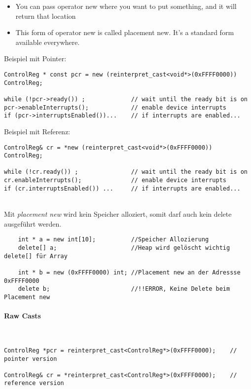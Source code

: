 \begin{itemize}
	\item You can pass operator new where you want to put something, and it will return that location
	\item This form of operator new is called placement new.
			It’s a standard form available everywhere.
\end{itemize}

Beispiel mit Pointer:
\begin{lstlisting}
ControlReg * const pcr = new (reinterpret_cast<void*>(0xFFFF0000)) ControlReg;

while (!pcr->ready()) ; 			// wait until the ready bit is on
pcr->enableInterrupts(); 			// enable device interrupts
if (pcr->interruptsEnabled())... 	// if interrupts are enabled...

\end{lstlisting}

Beispiel mit Referenz:
\begin{lstlisting}
ControlReg& cr = *new (reinterpret_cast<void*>(0xFFFF0000)) ControlReg;

while (!cr.ready()) ; 				// wait until the ready bit is on
cr.enableInterrupts(); 				// enable device interrupts
if (cr.interruptsEnabled()) ... 	// if interrupts are enabled...
\end{lstlisting}
~ \\
Mit \textit{placement new} wird kein Speicher alloziert, somit darf auch kein delete ausgeführt werden.
\begin{lstlisting}
    int * a = new int[10];          //Speicher Allozierung 
    delete[] a;                     //Heap wird gelöscht wichtig delete[] für Array
    
    int * b = new (0xFFFF0000) int; //Placement new an der Adressse 0xFFFF0000
    delete b;                       //!!ERROR, Keine Delete beim Placement new
\end{lstlisting}

\paragraph{Raw Casts}~
\begin{lstlisting}
ControlReg *pcr = reinterpret_cast<ControlReg*>(0xFFFF0000);	// pointer version

ControlReg& cr = *reinterpret_cast<ControlReg*>(0xFFFF0000);	// reference version
\end{lstlisting}



